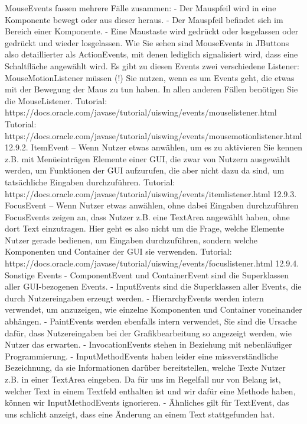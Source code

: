 MouseEvents fassen mehrere Fälle zusammen:
-	Der Mauspfeil wird in eine Komponente bewegt oder aus dieser heraus.
-	Der Mauspfeil befindet sich im Bereich einer Komponente.
-	Eine Maustaste wird gedrückt oder losgelassen oder gedrückt und wieder losgelassen.
Wie Sie sehen sind MouseEvents in JButtons also detaillierter als ActionEvents, mit denen lediglich signalisiert wird, dass eine Schaltfläche angewählt wird.
Es gibt zu diesen Events zwei verschiedene Listener: MouseMotionListener müssen (!) Sie nutzen, wenn es um Events geht, die etwas mit der Bewegung der Maus zu tun haben. In allen anderen Fällen benötigen Sie die MouseListener.
Tutorial: https://docs.oracle.com/javase/tutorial/uiswing/events/mouselistener.html 
Tutorial: https://docs.oracle.com/javase/tutorial/uiswing/events/mousemotionlistener.html 
12.9.2.	ItemEvent – Wenn Nutzer etwas anwählen, um es zu aktivieren
Sie kennen z.B. mit Menüeinträgen Elemente einer GUI, die zwar von Nutzern ausgewählt werden, um Funktionen der GUI aufzurufen, die aber nicht dazu da sind, um tatsächliche Eingaben durchzuführen.
Tutorial: https://docs.oracle.com/javase/tutorial/uiswing/events/itemlistener.html 
12.9.3.	FocusEvent – Wenn Nutzer etwas anwählen, ohne dabei Eingaben durchzuführen
FocusEvents zeigen an, dass Nutzer z.B. eine TextArea angewählt haben, ohne dort Text einzutragen. Hier geht es also nicht um die Frage, welche Elemente Nutzer gerade bedienen, um Eingaben durchzuführen, sondern welche Komponenten und Container der GUI sie verwenden.
Tutorial: https://docs.oracle.com/javase/tutorial/uiswing/events/focuslistener.html
12.9.4.	Sonstige Events
-	ComponentEvent und ContainerEvent sind die Superklassen aller GUI-bezogenen Events. 
-	InputEvents sind die Superklassen aller Events, die durch Nutzereingaben erzeugt werden. 
-	HierarchyEvents werden intern verwendet, um anzuzeigen, wie einzelne Komponenten und Container voneinander abhängen. 
-	PaintEvents werden ebenfalls intern verwendet, Sie sind die Ursache dafür, dass Nutzereingaben bei der Grafikbearbeitung so angezeigt werden, wie Nutzer das erwarten. 
-	InvocationEvents stehen in Beziehung mit nebenläufiger Programmierung.
-	InputMethodEvents haben leider eine missverständliche Bezeichnung, da sie Informationen darüber bereitstellen, welche Texte Nutzer z.B. in einer TextArea eingeben. Da für uns im Regelfall nur von Belang ist, welcher Text in einem Textfeld enthalten ist und wir dafür eine Methode haben, können wir InputMethodEvents ignorieren.
-	Ähnliches gilt für TextEvent, das uns schlicht anzeigt, dass eine Änderung an einem Text stattgefunden hat.
